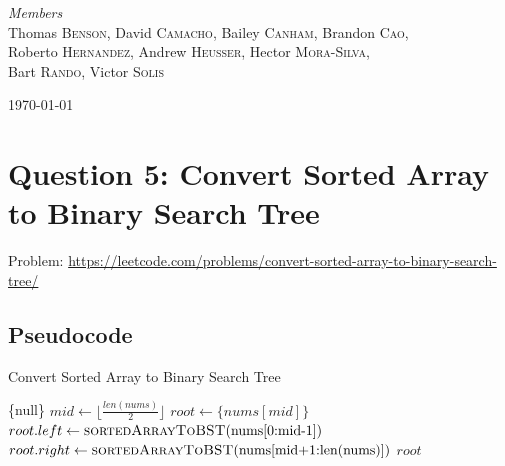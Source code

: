 \documentclass[11pt]{article}
\begin{document}
\begin{titlepage}
	{\large\textit{Members}}\\
	Thomas \textsc{Benson},
	David \textsc{Camacho},
	Bailey \textsc{Canham},
	Brandon \textsc{Cao},\\
	Roberto \textsc{Hernandez},
	Andrew \textsc{Heusser},
    Hector \textsc{Mora-Silva},\\
	Bart \textsc{Rando},
	Victor \textsc{Solis}

	\vfill\vfill\vfill 
	{\large\today} 

	\vfill 

\end{titlepage}


\tableofcontents
\newpage


\section{Question 5: Convert Sorted Array to Binary Search Tree}
Problem: \url{https://leetcode.com/problems/convert-sorted-array-to-binary-search-tree/}

\subsection{Pseudocode}


\begin{algorithm}[H]
    \caption{Convert Sorted Array to Binary Search Tree}
    \begin{algorithmic}
                \State \Return \{null\}
            \EndIf
            \State $mid \gets \lfloor \frac{len(nums)}{2} \rfloor$
            \State $root \gets \{nums[mid]\}$
            \State $root.left \gets \Call{sortedArrayToBST}{$nums[0:mid-1]$}$
            \State $root.right \gets \Call{sortedArrayToBST}{$nums[mid+1:len(nums)]$}$
            \State \Return $root$
        \EndFunction
    \end{algorithmic}
\end{algorithm}
\end{document}
